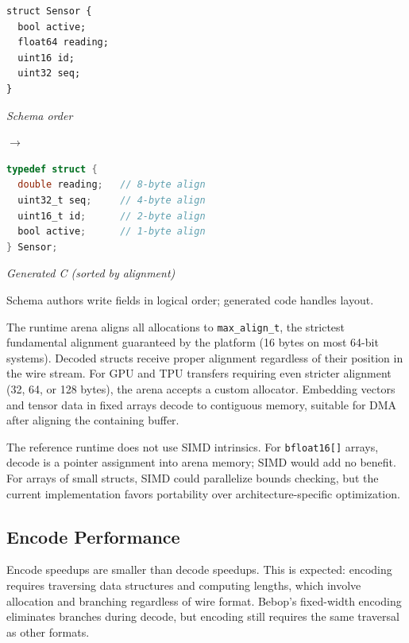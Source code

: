 \documentclass[10pt,onecolumn]{article}
\begin{document}
\vspace{4pt}
\noindent\begin{minipage}{\textwidth}
\footnotesize
\begin{minipage}[t]{0.38\textwidth}
\begin{lstlisting}[language=bebop,aboveskip=2pt,belowskip=0pt]
struct Sensor {
  bool active;
  float64 reading;
  uint16 id;
  uint32 seq;
}
\end{lstlisting}
\centering\scriptsize\textit{Schema order}
\end{minipage}\hfill
$\rightarrow$\hfill
\begin{minipage}[t]{0.52\textwidth}
\begin{lstlisting}[language=C,aboveskip=2pt,belowskip=0pt]
typedef struct {
  double reading;   // 8-byte align
  uint32_t seq;     // 4-byte align
  uint16_t id;      // 2-byte align
  bool active;      // 1-byte align
} Sensor;
\end{lstlisting}
\centering\scriptsize\textit{Generated C (sorted by alignment)}
\end{minipage}
\end{minipage}

\vspace{4pt}
\noindent Schema authors write fields in logical order; generated code handles layout.

The runtime arena aligns all allocations to \texttt{max\_align\_t}, the strictest fundamental alignment guaranteed by the platform (16 bytes on most 64-bit systems). Decoded structs receive proper alignment regardless of their position in the wire stream. For GPU and TPU transfers requiring even stricter alignment (32, 64, or 128 bytes), the arena accepts a custom allocator. Embedding vectors and tensor data in fixed arrays decode to contiguous memory, suitable for DMA after aligning the containing buffer.

The reference runtime does not use SIMD intrinsics. For \texttt{bfloat16[]} arrays, decode is a pointer assignment into arena memory; SIMD would add no benefit. For arrays of small structs, SIMD could parallelize bounds checking, but the current implementation favors portability over architecture-specific optimization.

\subsection{Encode Performance}

Encode speedups are smaller than decode speedups. This is expected: encoding requires traversing data structures and computing lengths, which involve allocation and branching regardless of wire format. Bebop's fixed-width encoding eliminates branches during decode, but encoding still requires the same traversal as other formats.
\end{document}
